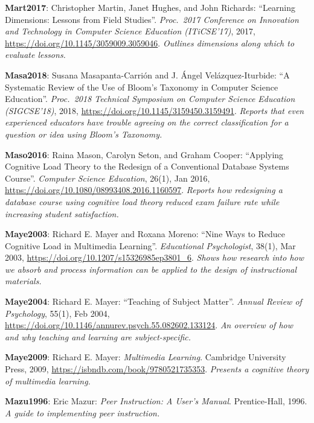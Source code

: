 \textbf{\hypertarget{b:Mart2017}{Mart2017}\label{b:Mart2017}}: Christopher Martin, Janet Hughes, and John Richards: ``Learning Dimensions: Lessons from Field Studies''. \emph{Proc.\ 2017 Conference on Innovation and Technology in Computer Science Education (ITiCSE'17)}, 2017, \url{https://doi.org/10.1145/3059009.3059046}. \emph{Outlines dimensions along which to evaluate lessons.}

\textbf{\hypertarget{b:Masa2018}{Masa2018}\label{b:Masa2018}}: Susana Masapanta-Carrión and J. Ángel Velázquez-Iturbide: ``A Systematic Review of the Use of Bloom's Taxonomy in Computer Science Education''. \emph{Proc.\ 2018 Technical Symposium on Computer Science Education (SIGCSE'18)}, 2018, \url{https://doi.org/10.1145/3159450.3159491}. \emph{Reports that even experienced educators have trouble agreeing on the correct classification for a question or idea using Bloom's Taxonomy.}

\textbf{\hypertarget{b:Maso2016}{Maso2016}\label{b:Maso2016}}: Raina Mason, Carolyn Seton, and Graham Cooper: ``Applying Cognitive Load Theory to the Redesign of a Conventional Database Systems Course''. \emph{Computer Science Education}, 26(1), Jan 2016, \url{https://doi.org/10.1080/08993408.2016.1160597}. \emph{Reports how redesigning a database course using cognitive load theory reduced exam failure rate while increasing student satisfaction.}

\textbf{\hypertarget{b:Maye2003}{Maye2003}\label{b:Maye2003}}: Richard E. Mayer and Roxana Moreno: ``Nine Ways to Reduce Cognitive Load in Multimedia Learning''. \emph{Educational Psychologist}, 38(1), Mar 2003, \url{https://doi.org/10.1207/s15326985ep3801_6}. \emph{Shows how research into how we absorb and process information can be applied to the design of instructional materials.}

\textbf{\hypertarget{b:Maye2004}{Maye2004}\label{b:Maye2004}}: Richard E. Mayer: ``Teaching of Subject Matter''. \emph{Annual Review of Psychology}, 55(1), Feb 2004, \url{https://doi.org/10.1146/annurev.psych.55.082602.133124}. \emph{An overview of how and why teaching and learning are subject-specific.}

\textbf{\hypertarget{b:Maye2009}{Maye2009}\label{b:Maye2009}}: Richard E. Mayer: \emph{Multimedia Learning}. Cambridge University Press, 2009, \url{https://isbndb.com/book/9780521735353}. \emph{Presents a cognitive theory of multimedia learning.}

\textbf{\hypertarget{b:Mazu1996}{Mazu1996}\label{b:Mazu1996}}: Eric Mazur: \emph{Peer Instruction: A User's Manual}. Prentice-Hall, 1996. \emph{A guide to implementing peer instruction.}

